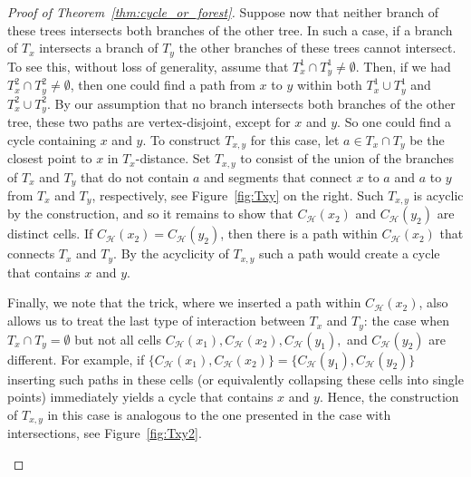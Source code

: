 \documentclass{article}
\theoremstyle{plain}
\theoremstyle{definition}
\newcommand{\cH}{\mathcal{H}}
\begin{document}
\begin{proof}[Proof of Theorem~\ref{thm:cycle_or_forest}]
Suppose now that neither branch of these trees intersects both branches of the other tree. In such a case, if a branch of $T_x$ intersects a branch of $T_y$ the other branches of these trees cannot intersect. To see this, without loss of generality, assume that $T^1_x\cap T^1_y\neq\emptyset$. Then, if we had $T^2_x \cap T^2_y\neq \emptyset$, then one could find a path from $x$ to $y$ within both $T^1_x \cup T^1_y$ and $T^2_x \cup T^2_y$. By our assumption that no branch intersects both branches of the other tree, these two paths are vertex-disjoint, except for $x$ and $y$. So one could find a cycle containing $x$ and $y$.
To construct $T_{x,y}$ for this case, let $a\in T_x\cap T_y$ be the closest point to $x$ in $T_x$-distance. Set $T_{x,y}$ to consist of the union of the branches of $T_x$ and $T_y$ that do not contain $a$ and segments that connect $x$ to $a$ and $a$ to $y$ from $T_x$ and $T_y$, respectively, see Figure~\ref{fig:Txy} on the right. Such $T_{x,y}$ is acyclic by the construction, and so it remains to show that $C_{\cH}(x_2)$ and $C_{\cH}(y_2)$ are distinct cells. If $C_{\cH}(x_2)=C_{\cH}(y_2)$, then there is a path within $C_{\cH}(x_2)$ that connects $T_x$ and $T_y$. By the acyclicity of $T_{x,y}$ such a path would create a cycle that contains $x$ and $y$.

Finally, we note that the trick, where we inserted a path within $C_{\cH}(x_2)$, also allows us to treat the last type of interaction between $T_x$ and $T_y$: the case when $T_x\cap T_y=\emptyset$ but not all cells $C_{\cH}(x_1),C_{\cH}(x_2),C_{\cH}(y_1),$ and $C_{\cH}(y_2)$ are different. For example, if $\{C_{\cH}(x_1),C_{\cH}(x_2)\}=\{C_{\cH}(y_1),C_{\cH}(y_2)\}$ inserting such paths in these cells (or equivalently collapsing these cells into single points) immediately yields a cycle that contains $x$ and $y$. Hence, the construction of $T_{x,y}$ in this case is analogous to the one presented in the case with intersections, see Figure~\ref{fig:Txy2}.

\begin{figure}[htb]
\begin{center}
\end{center}
\end{figure}
\end{proof}
\end{document}
